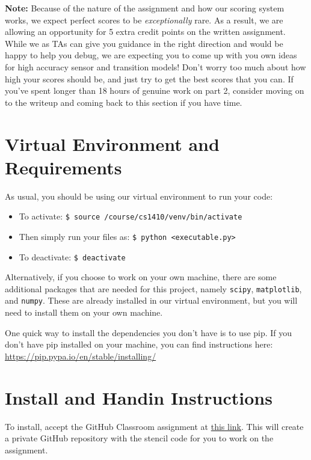\documentclass{article}
\begin{document}
\textbf{Note:} Because of the nature of the assignment and how our scoring system works, we expect perfect scores to be \textit{exceptionally} rare. As a result, we are allowing an opportunity for 5 extra credit points on the written assignment. While we as TAs can give you guidance in the right direction and would be happy to help you debug, we are expecting you to come up with you own ideas for high accuracy sensor and transition models! Don't worry too much about how high your scores should be, and just try to get the best scores that you can. If you've spent longer than 18 hours of genuine work on part 2, consider moving on to the writeup and coming back to this section if you have time.
\vspace{20mm}
\section{Virtual Environment and Requirements}
As usual, you should be using our virtual environment to run your code:
\begin{itemize}
\setlength\itemsep{0em}
\item To activate: \texttt{\$ source /course/cs1410/venv/bin/activate}
\item Then simply run your files as: \texttt{\$ python <executable.py>}
\item To deactivate: \texttt{\$ deactivate}
\end{itemize}

Alternatively, if you choose to work on your own machine, there are some additional packages that are needed for this project, namely \texttt{scipy}, \texttt{matplotlib}, and \texttt{numpy}. These are already installed in our virtual environment, but you will need to install them on your own machine.

One quick way to install the dependencies you don't have is to use pip. If you don't have pip installed on your machine, you can find instructions here: \url{https://pip.pypa.io/en/stable/installing/}

\section{Install and Handin Instructions}
To install, accept the GitHub Classroom assignment at \href{https://classroom.github.com/a/iVMO1Msd}{this link}. This will
create a private GitHub repository with the stencil code for you to work on the
assignment.
\end{document}
